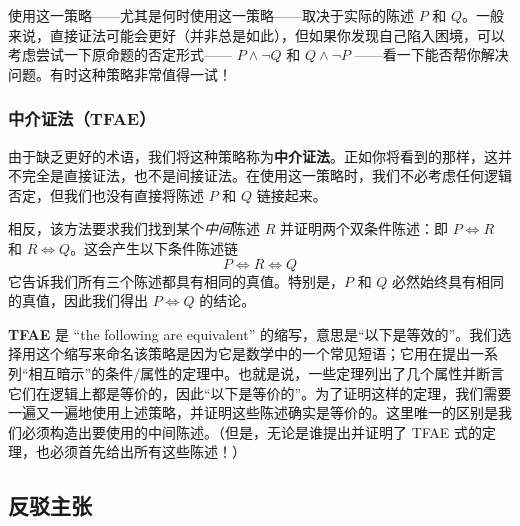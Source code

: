 使用这一策略——尤其是何时使用这一策略——取决于实际的陈述 $P$ 和 $Q$。一般来说，直接证法可能会更好（并非总是如此），但如果你发现自己陷入困境，可以考虑尝试一下原命题的否定形式—— $P \land \neg Q$ 和 $Q \land \neg P$ ——看一下能否帮你解决问题。有时这种策略非常值得一试！

\subsubsection*{中介证法（TFAE）}

由于缺乏更好的术语，我们将这种策略称为\textbf{中介证法}。正如你将看到的那样，这并不完全是直接证法，也不是间接证法。在使用这一策略时，我们不必考虑任何逻辑否定，但我们也没有直接将陈述 $P$ 和 $Q$ 链接起来。

相反，该方法要求我们找到某个\emph{中间}陈述 $R$ 并证明两个双条件陈述：即 $P \iff R$ 和 $R \iff Q$。这会产生以下条件陈述链
\[P \iff R \iff Q\]
它告诉我们所有三个陈述都具有相同的真值。特别是，$P$ 和 $Q$ 必然始终具有相同的真值，因此我们得出 $P \iff Q$ 的结论。

\textbf{TFAE} 是 ``the following are equivalent'' 的缩写，意思是``以下是等效的''。我们选择用这个缩写来命名该策略是因为它是数学中的一个常见短语；它用在提出一系列``相互暗示''的条件/属性的定理中。也就是说，一些定理列出了几个属性并断言它们在逻辑上都是等价的，因此``以下是等价的''。为了证明这样的定理，我们需要一遍又一遍地使用上述策略，并证明这些陈述确实是等价的。这里唯一的区别是我们必须构造出要使用的中间陈述。（但是，无论是谁提出并证明了 TFAE 式的定理，也必须首先给出所有这些陈述！）

\begin{center}
    \noindent {}
\end{center}

\subsection{反驳主张}\label{sec:section4.9.7}

